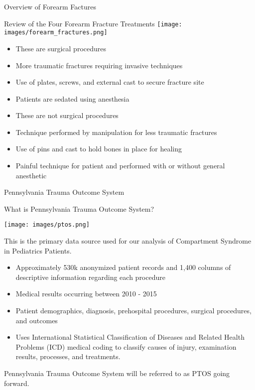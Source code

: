\documentclass[
  ignorenonframetext,
]{beamer}
\providecommand{\tightlist}{%
  \setlength{\itemsep}{0pt}\setlength{\parskip}{0pt}}
\begin{document}
\begin{frame}{ Overview of Forearm Factures }
\begin{block}{Review of the Four Forearm Fracture Treatments}
\texttt{[image: images/forearm\_fractures.png]}

\begin{itemize}
\tightlist
\item
  These are surgical procedures
\item
  More traumatic fractures requiring invasive techniques
\item
  Use of plates, screws, and external cast to secure fracture site
\item
  Patients are sedated using anesthesia
\end{itemize}

\begin{itemize}
\tightlist
\item
  These are not surgical procedures
\item
  Technique performed by manipulation for less traumatic fractures
\item
  Use of pins and cast to hold bones in place for healing
\item
  Painful technique for patient and performed with or without general
  anesthetic
\end{itemize}

\end{block}

\end{frame}

\begin{frame}{ Pennsylvania Trauma Outcome System }
\protect\hypertarget{pennsylvania-trauma-outcome-system}{}

\begin{block}{What is Pennsylvania Trauma Outcome System?}

\texttt{[image: images/ptos.png]}

This is the primary data source used for our analysis of Compartment
Syndrome in Pediatrics Patients.

\begin{itemize}
\tightlist
\item
  Approximately 530k anonymized patient records and 1,400 columns of
  descriptive information regarding each procedure
\item
  Medical results occurring between 2010 - 2015
\item
  Patient demographics, diagnosis, prehospital procedures, surgical
  procedures, and outcomes
\item
  Uses International Statistical Classification of Diseases and Related
  Health Problems (ICD) medical coding to classify causes of injury,
  examination results, processes, and treatments.
\end{itemize}

Pennsylvania Trauma Outcome System will be referred to as PTOS going
forward.

\end{block}

\end{frame}
\end{document}
